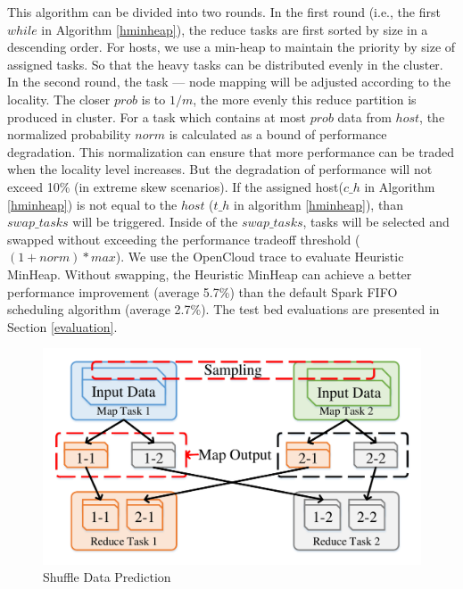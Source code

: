 This algorithm can be divided into two rounds. In the first round (i.e., the first $while$ in Algorithm \ref{hminheap}), the reduce tasks are first sorted by size in a descending order. For hosts, we use a min-heap to maintain the priority by size of assigned tasks. So that the heavy tasks can be distributed evenly in the cluster.
In the second round, the task --- node mapping will be adjusted according to the locality. The closer $prob$ is to $1/m$, the more evenly this reduce partition is produced in cluster. For a task which contains at most $prob$ data from $host$, the normalized probability $norm$ is calculated as a bound of performance degradation. This normalization can ensure that more performance can be traded when the locality level increases. But the degradation of performance will not exceed 10\% (in extreme skew scenarios). If the assigned host($c\_h$ in Algorithm \ref{hminheap}) is not equal to the $host$ ($t\_h$ in algorithm \ref{hminheap}), than $swap\_tasks$ will be triggered.
Inside of the $swap\_tasks$, tasks will be selected and swapped without exceeding the performance tradeoff threshold ($\left(1+norm\right)*max$). We use the OpenCloud \cite{opencloudtrace} trace to evaluate Heuristic MinHeap. Without swapping, the Heuristic MinHeap can achieve a better performance improvement (average 5.7\%) than the default Spark FIFO scheduling algorithm (average 2.7\%). The test bed evaluations are presented in Section \ref{evaluation}.

\begin{figure}
	\centering
	\includegraphics[width=0.9\linewidth]{fig/shuffle}
	\caption{Shuffle Data Prediction}
	\label{fig:shuffle}
\end{figure}

